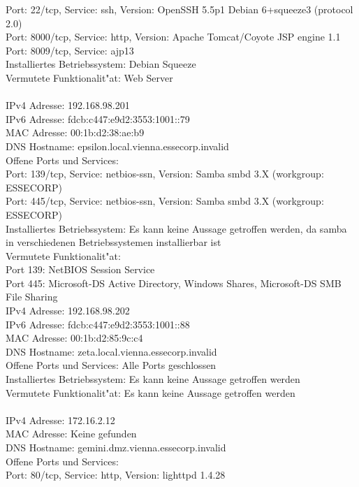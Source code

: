 \documentclass[12pt,a4paper,titlepage,oneside]{scrartcl}
\begin{document}
Port: 22/tcp, Service: ssh, Version: OpenSSH 5.5p1 Debian 6+squeeze3 (protocol 2.0)\\
Port: 8000/tcp, Service: http, Version: Apache Tomcat/Coyote JSP engine 1.1\\
Port: 8009/tcp, Service: ajp13\\
Installiertes Betriebssystem: Debian Squeeze\\
Vermutete Funktionalit"at: Web Server\\
\\
IPv4 Adresse: 192.168.98.201\\
IPv6 Adresse: fdcb:c447:e9d2:3553:1001::79\\
MAC Adresse: 00:1b:d2:38:ae:b9\\
DNS Hostname: epsilon.local.vienna.essecorp.invalid\\
Offene Ports und Services:\\
Port: 139/tcp, Service: netbios-ssn, Version: Samba smbd 3.X (workgroup: ESSECORP)\\
Port: 445/tcp, Service: netbios-ssn, Version: Samba smbd 3.X (workgroup: ESSECORP)\\
Installiertes Betriebssystem: Es kann keine Aussage getroffen werden, da samba in verschiedenen Betriebssystemen installierbar ist\\
Vermutete Funktionalit"at:\\
Port 139: NetBIOS Session Service\\
Port 445: Microsoft-DS Active Directory, Windows Shares, Microsoft-DS SMB File Sharing
\\
IPv4 Adresse: 192.168.98.202\\
IPv6 Adresse: fdcb:c447:e9d2:3553:1001::88\\
MAC Adresse: 00:1b:d2:85:9c:c4\\
DNS Hostname: zeta.local.vienna.essecorp.invalid\\
Offene Ports und Services: Alle Ports geschlossen\\
Installiertes Betriebssystem: Es kann keine Aussage getroffen werden\\
Vermutete Funktionalit"at: Es kann keine Aussage getroffen werden\\
\\
IPv4 Adresse: 172.16.2.12\\
MAC Adresse: Keine gefunden\\
DNS Hostname: gemini.dmz.vienna.essecorp.invalid\\
Offene Ports und Services:\\
Port: 80/tcp, Service: http, Version: lighttpd 1.4.28\\
\end{document}
